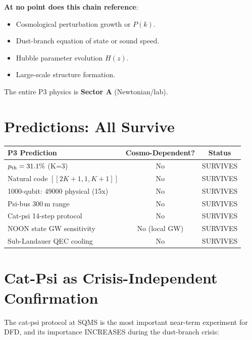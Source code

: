 \documentclass[11pt]{article}
\begin{document}
\textbf{At no point does this chain reference}:
\begin{itemize}
\item Cosmological perturbation growth or $P(k)$.
\item Dust-branch equation of state or sound speed.
\item Hubble parameter evolution $H(z)$.
\item Large-scale structure formation.
\end{itemize}

The entire P3 physics is \textbf{Sector A} (Newtonian/lab).

\section{Predictions: All Survive}

\begin{table}[h]
\centering
\begin{tabular}{lcc}
\toprule
\textbf{P3 Prediction} & \textbf{Cosmo-Dependent?} & \textbf{Status} \\
\midrule
$p_{\rm th} = 31.1\%$ (K=3) & No & SURVIVES \\
Natural code $[[2K+1,1,K+1]]$ & No & SURVIVES \\
1000-qubit: 49000 physical (15x) & No & SURVIVES \\
Psi-bus 300\,m range & No & SURVIVES \\
Cat-psi 14-step protocol & No & SURVIVES \\
NOON state GW sensitivity & No (local GW) & SURVIVES \\
Sub-Landauer QEC cooling & No & SURVIVES \\
\bottomrule
\end{tabular}
\end{table}

\section{Cat-Psi as Crisis-Independent Confirmation}

The cat-psi protocol at SQMS is the most important near-term experiment
for DFD, and its importance INCREASES during the dust-branch crisis:
\end{document}
